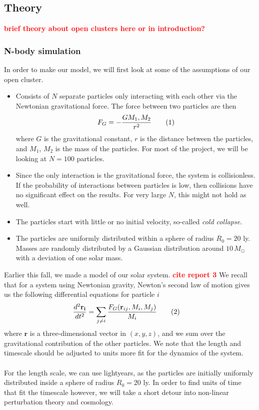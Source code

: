 \documentclass{article}
\newcommand\red[1]{\textcolor{red}{\textbf{#1}}}
\newcommand\numberthis{\addtocounter{equation}{1}\tag{\theequation}}
\begin{document}
\subsection{Theory}
\red{brief theory about open clusters here or in introduction?}
\subsubsection{N-body simulation}
In order to make our model, we will first look at some of the assumptions of our open cluster.
\begin{itemize}
  \item Consists of $N$ separate particles only interacting with each other via the Newtonian gravitational force. The force between two particles are then
    \begin{align*}
      F_G = -\frac{G M_1, M_2}{r^2}\numberthis\label{eq:newton}
    \end{align*}
    where $G$ is the gravitational constant, $r$ is the distance between the particles, and $M_1$, $M_2$ is the mass of the particles. For most of the project, we will be looking at $N=100$ particles.
  \item Since the only interaction is the gravitational force, the system is collisionless. If the probability of interactions between particles is low, then collisions have no significant effect on the results. For very large $N$, this might not hold as well.
  \item The particles start with little or no initial velocity, so-called \textit{cold collapse}.
  \item The particles are uniformly distributed within a sphere of radius $R_0 = 20$ ly. Masses are randomly distributed by a Gaussian distribution around $10\,M_{\odot}$ with a deviation of one solar mass.
\end{itemize}
Earlier this fall, we made a model of our solar system. \red{cite report 3} We recall that for a system using Newtonian gravity, Newton's second law of motion gives us the following differential equations for particle $i$
\begin{align*}
  \frac{d^2\mathbf{r_i}}{dt^2} &= \sum\limits_{j\neq i}\frac{F_G(\mathbf{r}_{ij}, M_i,M_j)}{M_i}\numberthis\label{eq:diff_eq}
\end{align*}
where $\mathbf{r}$ is a three-dimensional vector in $(x,y,z)$, and we sum over the gravitational contribution of the other particles. We note that the length and timescale should be adjusted to units more fit for the dynamics of the system.\\\\
For the length scale, we can use lightyears, as the particles are initially uniformly distributed inside a sphere of radius $R_0 = 20$ ly. In order to find units of time that fit the timescale however, we will take a short detour into non-linear perturbation theory and cosmology.
\end{document}

